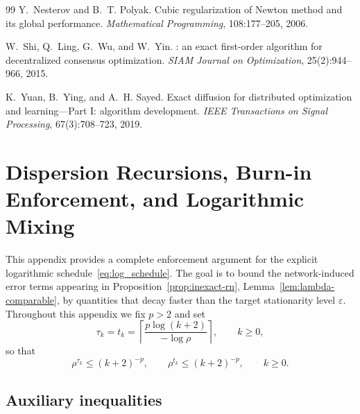 \documentclass[11pt,a4paper]{article}
\begin{document}
\begin{thebibliography}{99}
		Y.~Nesterov and B.~T. Polyak.
		\newblock Cubic regularization of {N}ewton method and its global performance.
		\newblock \emph{Mathematical Programming}, 108:177--205, 2006.
		
		W.~Shi, Q.~Ling, G.~Wu, and W.~Yin.
		: an exact first-order algorithm for decentralized consensus optimization.
		\newblock \emph{SIAM Journal on Optimization}, 25(2):944--966, 2015.
		
		K.~Yuan, B.~Ying, and A.~H. Sayed.
		\newblock Exact diffusion for distributed optimization and learning---Part {I}: algorithm development.
		\newblock \emph{IEEE Transactions on Signal Processing}, 67(3):708--723, 2019.
		
	\end{thebibliography}
	
	
	\appendix
	\section{Dispersion Recursions, Burn-in Enforcement, and Logarithmic Mixing}\label{app:dispersion}
	
	This appendix provides a complete enforcement argument for the explicit logarithmic schedule~\eqref{eq:log_schedule}.
	The goal is to bound the network-induced error terms appearing in
	Proposition~\ref{prop:inexact-rn}, Lemma~\ref{lem:lambda-comparable},
	by quantities that decay faster than the target stationarity level $\varepsilon$.
	Throughout this appendix we fix $p>2$ and set
	\[
	\tau_k=t_k=\left\lceil\frac{p\log(k+2)}{-\log\rho}\right\rceil,\qquad k\ge 0,
	\]
	so that
	\begin{equation}\label{eq:rho_poly}
		\rho^{\tau_k}\le (k+2)^{-p},\qquad \rho^{t_k}\le (k+2)^{-p},\qquad k\ge 0.
	\end{equation}
	
	\subsection{Auxiliary inequalities}
	
\end{document}
